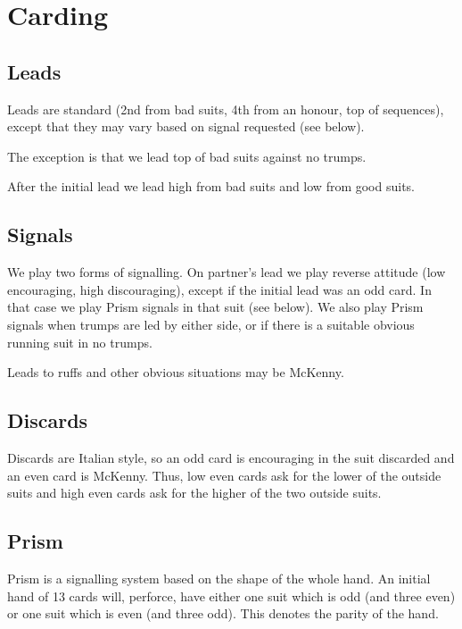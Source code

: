 \documentclass[a4paper,14pt]{extarticle}
\begin{document}
\newpage

\section{Carding}
\label{sec:carding}

\subsection{Leads}
\label{sec:card:leads}

Leads are standard (2nd from bad suits, 4th from an honour, top of sequences),
except that they may vary based on signal requested (see below).

The exception is that we lead top of bad suits against no trumps.

After the initial lead we lead high from bad suits and low from good suits.

\subsection{Signals}
\label{sec:card:signals}

We play two forms of signalling. On partner's lead we play reverse attitude
(low encouraging, high discouraging), except if the initial lead was an odd
card. In that case we play Prism signals in that suit (see below). We also play
Prism signals when trumps are led by either side, or if there is a suitable
obvious running suit in no trumps.

Leads to ruffs and other obvious situations may be McKenny.

\subsection{Discards}
\label{sec:card:discards}

Discards are Italian style, so an odd card is encouraging in the suit discarded
and an even card is McKenny. Thus, low even cards ask for the lower of the
outside suits and high even cards ask for the higher of the two outside
suits.

\newpage
\subsection{Prism}
\label{sec:card:prism}

Prism is a signalling system based on the shape of the whole hand. An initial
hand of 13 cards will, perforce, have either one suit which is odd (and three
even) or one suit which is even (and three odd). This denotes the parity of the
hand.
\end{document}
